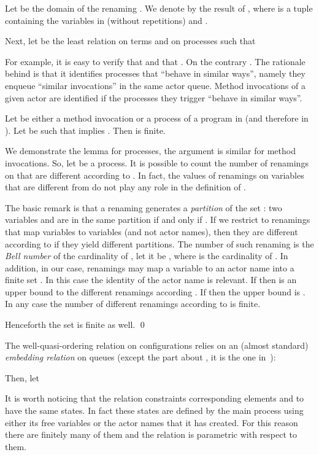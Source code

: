 \documentclass{LMCS}
\theoremstyle{plain}\newtheorem{proposition}[thm]{Proposition}
\theoremstyle{plain}\newtheorem{lemma}[thm]{Lemma}
\theoremstyle{plain}\newtheorem{theorem}[thm]{Theorem}
\theoremstyle{plain}\newtheorem{corollary}[thm]{Corollary}
\newif\ifconf \conffalse
\newcommand{\actba}{}
\newcommand{\actroba}{}
\begin{document}
Let  be the domain of the renaming . 
We denote by  the result of , where 
 is a tuple containing the variables in  
(without repetitions) and .


Next, let  be the least relation on terms  and on processes such that
{\small

}
For example, it is easy to verify that  and that
. On the contrary 
. The rationale behind  is that it
identifies  processes that ``behave in similar ways'', namely they
enqueue ``similar invocations'' in the same actor queue. Method invocations
 of a given actor 
are identified if the processes they trigger
 ``behave in similar ways''.


\begin{lem}
\label{prop.finteterms}
Let  be either a method invocation  or a process of a program in {\actba} (and therefore in {\actroba}).
Let  be
such that  implies . 
Then  is finite.
\end{lem}

\ifconf
\else
\proof
 We demonstrate the lemma for processes, the argument is similar for 
method invocations. So, let   be a process. It is possible to count the 
number of renamings  on  that are different according to
. In fact, the values of renamings on variables that are 
different from   do not play any role in the definition of .

The basic remark is that a renaming  generates a \emph{partition} of the
set : two variables  and  are in the same partition if and only
if . If we restrict to renamings that map variables to
variables (and not actor names), then they are different according to 
 if they
yield different partitions. The number of such renaming is the 
\emph{Bell number} of the cardinality of , let it be
, where  is the cardinality of . In 
addition, in our case, renamings may map a variable 
to an actor name into a finite set . In this case
the identity of the actor name is relevant. If  then 
 is an upper bound to the different renamings according . If  then
the upper bound is . In any case
the number of different renamings according to  is finite.

Henceforth the set  is finite as well.
\qed
\fi


The well-quasi-ordering relation on configurations relies on an (almost standard) 
\emph{embedding relation}  on queues (except the part about , it 
is the one in~\cite{Finkel:2001}):
{\small

}
Then, let
{\small

}
It is worth noticing that the relation  constraints corresponding
elements  and  to have the same states. In fact these states are defined by
the main process using either its free variables or the actor names that it
has created. For this reason there are finitely many of them and the relation
 is parametric with respect to them.
\end{document}
